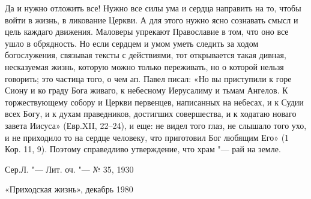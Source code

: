 Да и нужно отложить все! Нужно все силы ума и сердца направить на то, чтобы войти в жизнь, в ликование Церкви. А для этого нужно ясно сознавать смысл и цель каждаго движения. Маловеры упрекают Православие в том, что оно все ушло в обрядность. Но если сердцем и умом уметь следить за ходом богослужения, связывая тексты с действиями, тот открывается такая дивная, несказуемая жизнь, которую можно только переживать, но о которой нельзя говорить; это частица того, о чем ап. Павел писал: «Но вы приступили к горе Сиону и ко граду Бога живаго, к небесному Иерусалиму и тьмам Ангелов. К торжествующему собору и Церкви первенцев, написанных на небесах, и к Судии всех Богу, и к духам праведников, достигших совершества, и к ходатаю новаго завета Иисуса» (Евр.XII, 22--24), и еще: не видел того глаз, не слышало того ухо, и не приходило то на сердце человеку, что приготовил Бог любящим Его» (1 Кор. 11, 9). Поэтому справедливо утверждение, что храм "--- рай на земле.

\bigskip

Сер.Л. "--- Лит. оч. "--- № 35, 1930

«Приходская жизнь», декабрь 1980

 


\mychapterending
